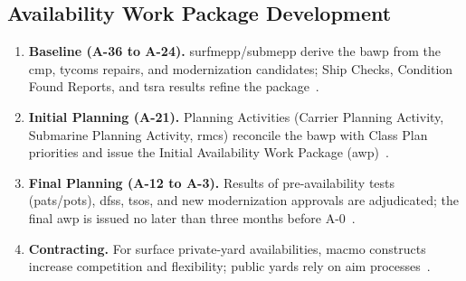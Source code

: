 \documentclass[../main.tex]{subfiles}
\begin{document}
\subsection{Availability Work Package Development}
\begin{enumerate}
  \item \textbf{Baseline (A-36 to A-24).} \ac{surfmepp}/\ac{submepp} derive the \ac{bawp} from the \ac{cmp}, \acp{tycom} repairs, and modernization candidates; Ship Checks, Condition Found Reports, and \ac{tsra} results refine the package~\autocite{edo-4-2-1-cno-availability-planning-2025,COMFLTFORCOMINST4790-3}.
  \item \textbf{Initial Planning (A-21).} Planning Activities (Carrier Planning Activity, Submarine Planning Activity, \acp{rmc}) reconcile the \ac{bawp} with Class Plan priorities and issue the Initial Availability Work Package (\ac{awp})~\autocite{edo-4-2-1-cno-availability-planning-2025}.
  \item \textbf{Final Planning (A-12 to A-3).} Results of pre-availability tests (\ac{pats}/\ac{pots}), \acp{dfs}, \acp{tso}, and new modernization approvals are adjudicated; the final \ac{awp} is issued no later than three months before A-0~\autocite{edo-4-2-1-cno-availability-planning-2025,OPNAVNOTE4700-24}.
  \item \textbf{Contracting.} For surface private-yard availabilities, \ac{macmo} constructs increase competition and flexibility; public yards rely on \ac{aim} processes~\autocite{edo-4-2-1-cno-availability-planning-2025}.
\end{enumerate}
\end{document}
